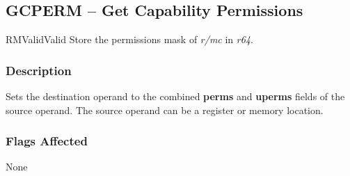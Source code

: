 \clearpage
{}
{}
\subsection*{GCPERM -- Get Capability Permissions}

\begin{x86opcodetable}
  {RM}{Valid}{Valid}
  {Store the permissions mask of \emph{r/mc} in \emph{r64}.}
\end{x86opcodetable}

\begin{x86opentable}
\end{x86opentable}

\subsubsection*{Description}

Sets the destination operand to the combined \textbf{perms} and
\textbf{uperms} fields of the source operand.  The source operand can
be a register or memory location.

\subsubsection*{Flags Affected}

None
